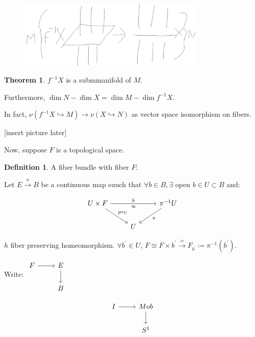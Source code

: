 \documentclass{article}
\theoremstyle{definition}
\newtheorem*{definition}{Definition}
\newtheorem{theorem}{Theorem}
\begin{document}
    \begin{figure}[H]
        \centering
        \includegraphics[width=0.8\textwidth]{img/transverse}
    \end{figure}

    \begin{theorem}
        \(f ^{-1} X\) is a submmanifold of \(M\).

        Furthermore, \(\dim N - \dim X = \dim M - \dim f ^{-1} X\).
    \end{theorem}

    In fact, \(\nu (f ^{-1} X \hookrightarrow M) \to \nu (X \hookrightarrow N)\) as vector space isomorphism on fibers.

    [insert picture later]

    Now, suppose \(F\) is a topological space.

    \begin{definition}
        A fiber bundle with fiber \(F\):

        Let \(E \xrightarrow{\pi} B\) be a continuous map suuch that \(\forall b\in B, \exists\) open \(b\in U \subset B\) and:

        \[
            \begin{tikzcd}
                U \times F \ar[rr, "h", "\approx"'] \ar[rd, "pr_U"] && \pi ^{-1} U \ar[ld,"\pi"] \\ & U 
            \end{tikzcd}
        \]

        \(h\) fiber preserving homeomorphism. \(\forall b^{\prime} \in U\), \(F \cong F \times b^{\prime} \xrightarrow{\approx} F_{b^{\prime}} \coloneqq \pi ^{-1} (b^{\prime})\).
    \end{definition}

    Write: \( \begin{tikzcd}
        F \ar[r] & E \ar[d] \\ & B 
        \end{tikzcd} \)

    \[
        \begin{tikzcd}
            I \ar[r] & Mob \ar[d] \\ & S^1
        \end{tikzcd}
    \]
\end{document}
